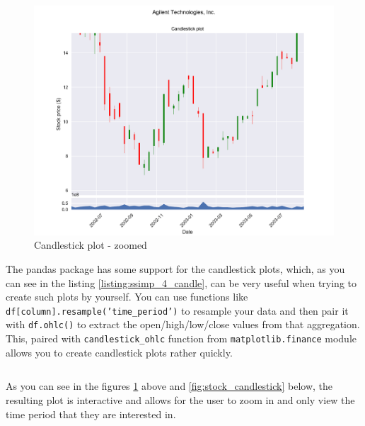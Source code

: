 \documentclass[12pt, a4paper]{article}
\begin{document}
\begin{figure}[H]
    \centering
    \includegraphics[width=\textwidth]{src/stocks/simple/candlestick_zoom}
    \caption{Candlestick plot - zoomed}
    \label{fig:stock_candlestick_zoom}
\end{figure}

The pandas package has some support for the candlestick plots, which, as you can see in the listing \ref{listing:ssimp_4_candle}, can be very useful when trying to create such plots by yourself.  You can use functions like \texttt{df[column].resample('time\_period')} to resample your data and then pair it with \texttt{df.ohlc()} to extract the open/high/low/close values from that aggregation. This, paired with \texttt{candlestick\_ohlc} function from \texttt{matplotlib.finance} module allows you to create candlestick plots rather quickly.

\bgroup
  \inputminted[linenos, breaklines=true, fontsize=\scriptsize, firstnumber=last]{python}{src/stocks/simple/4_candlestick.py}
  \label{listing:ssimp_4_candle}
\egroup

As you can see in the figures \ref{fig:stock_candlestick_zoom} above and \ref{fig:stock_candlestick} below, the resulting plot is interactive and allows for the user to zoom in and only view the time period that they are interested in.
\end{document}
